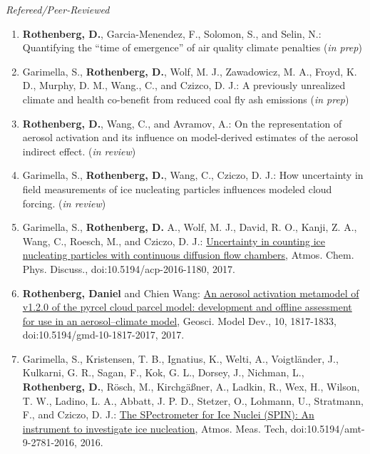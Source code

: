 \documentclass[11pt,letterpaper]{article}
\newcommand{\mhead}[1]{\leavevmode\marginpar{\sffamily\footnotesize #1}}
\begin{document}
\bigskip
\mhead{Publications}%
\emph{Refereed/Peer-Reviewed} \newline
\begin{enumerate}[itemindent=-10pt]

 \item \textbf{Rothenberg, D.}, Garcia-Menendez, F., Solomon, S., and Selin, N.: Quantifying the ``time of emergence'' of air quality climate penalties (\emph{in prep})

 \item Garimella, S., \textbf{Rothenberg, D.}, Wolf, M. J., Zawadowicz, M. A., Froyd, K. D., Murphy, D. M., Wang., C., and Czizco, D. J.: A previously unrealized climate and health co-benefit from reduced coal fly ash emissions (\emph{in prep})

 \item \textbf{Rothenberg, D.}, Wang, C., and Avramov, A.: On the representation of aerosol activation and its influence on model-derived estimates of the aerosol indirect effect. (\emph{in review})

 \item Garimella, S., \textbf{Rothenberg, D.}, Wang, C., Cziczo, D. J.: How uncertainty in field measurements of ice nucleating particles influences modeled cloud forcing. (\emph{in review})

 \item Garimella, S., \textbf{Rothenberg, D.} A., Wolf, M. J., David, R. O., Kanji, Z. A., Wang, C., Roesch, M., and Cziczo, D. J.: \href{http://dx.doi.org/10.5194/acp-2016-1180}{Uncertainty in counting ice nucleating particles with continuous diffusion flow chambers}, Atmos. Chem. Phys. Discuss., doi:10.5194/acp-2016-1180, 2017.

 \item \textbf{Rothenberg, Daniel} and Chien Wang:  \href{http://dx.doi.org/10.5194/gmd-10-1817-2017}{An aerosol activation metamodel of v1.2.0 of the pyrcel cloud parcel model: development and offline assessment for use in an aerosol–climate model}, Geosci. Model Dev., 10, 1817-1833, doi:10.5194/gmd-10-1817-2017, 2017.

 \item Garimella, S., Kristensen, T. B., Ignatius, K., Welti, A., Voigtländer, J., Kulkarni, G. R., Sagan, F., Kok, G. L., Dorsey, J., Nichman, L., \textbf{Rothenberg, D.}, Rösch, M., Kirchgäßner, A., Ladkin, R., Wex, H., Wilson, T. W., Ladino, L. A., Abbatt, J. P. D., Stetzer, O., Lohmann, U., Stratmann, F., and Cziczo, D. J.: \href{http://www.atmos-meas-tech.net/9/2781/2016/amt-9-2781-2016.html}{The SPectrometer for Ice Nuclei (SPIN): An instrument to investigate ice nucleation}, Atmos. Meas. Tech, doi:10.5194/amt-9-2781-2016, 2016.


\end{enumerate}
\end{document}
